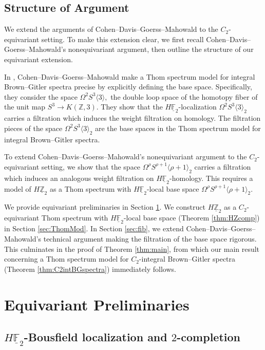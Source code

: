 \documentclass[]{amsart}  %
\theoremstyle{definition}
\numberwithin{equation}{section}
\numberwithin{figure}{section}
\newcommand{\mF}{{\mathbb F}}
\newcommand{\mZ}{{\mathbb Z}}
\newcommand{\umF}{\underline{\mF}}
\newcommand{\umZ}{\underline{\mZ}}
\newcommand{\0}{\langle 0 \rangle}
\begin{document}
\subsection{Structure of Argument}

We extend the arguments of Cohen--Davis--Goerss--Mahowald to the $C_2$-equivariant setting. To make this extension clear, we first recall Cohen--Davis--Goerss--Mahowald's nonequivariant argument, then outline the structure of our equivariant extension. 

In \cite{CDGM1988}, Cohen--Davis--Goerss--Mahowald make a Thom spectrum model for integral Brown--Gitler spectra precise by explicitly defining the base space. Specifically, they consider the space $\Omega^2 S^3 \langle 3 \rangle,$ the double loop space of the homotopy fiber of the unit map
$ S^3 \to K(\mZ, 3)$. They show that the $H \umF_2$-localization $\Omega^2 S^3 \langle 3 \rangle_2$ carries a filtration which induces the weight filtration on homology. The filtration pieces of the space $\Omega^2 S^3 \langle 3 \rangle_2$ are the base spaces in the Thom spectrum model for integral Brown--Gitler spectra. 

To extend Cohen--Davis--Goerss--Mahowald's nonequivariant argument to the $C_2$-equivariant setting, we show that the space $\Omega^\rho S^{\rho + 1} \langle \rho + 1 \rangle_2$ carries a filtration which induces an analogous weight filtration on $H \umF_2$-homology. This requires a model of $H \umZ_2$ as a Thom spectrum with $H \umF_2$-local base space $\Omega^\rho S^{\rho + 1} \langle \rho + 1 \rangle_2.$

We provide equivariant preliminaries in Section \ref{sec:prelim}. We construct $H \umZ_2$ as a $C_2$-equivariant Thom spectrum with $H\umF_2$-local base space (Theorem \ref{thm:HZcomp}) in Section \ref{sec:ThomMod}. In Section \ref{sec:fib}, we extend Cohen--Davis--Goerss--Mahowald's technical argument making the filtration of the base space
rigorous. This culminates in the proof of Theorem \ref{thm:main}, from which our main result concerning a Thom spectrum model for $C_2$-integral Brown--Gitler spectra (Theorem \ref{thm:C2intBGspectra}) immediately follows. 

\section{Equivariant Preliminaries} \label{sec:prelim}

\subsection{${H \umF_2}$-Bousfield localization and $2$-completion} \label{subsec:Bousfield}
\end{document}
